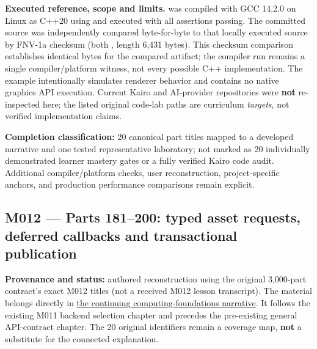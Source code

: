 \textbf{Executed reference, scope and limits.}  was compiled with GCC 14.2.0 on Linux as C++20 using  and executed with all assertions passing. The committed source was independently compared byte-for-byte to that locally executed source by FNV-1a checksum (both , length 6,431 bytes). This checksum comparison establishes identical bytes for the compared artifact; the compiler run remains a single compiler/platform witness, not every possible C++ implementation. The example intentionally simulates renderer behavior and contains no native graphics API execution. Current Kairo and AI-provider repositories were \textbf{not} re-inspected here; the listed original code-lab paths are curriculum \emph{targets}, not verified implementation claims.

\textbf{Completion classification:} 20 canonical part titles mapped to a developed narrative and one tested representative laboratory; not marked as 20 individually demonstrated learner mastery gates or a fully verified Kairo code audit. Additional compiler/platform checks, user reconstruction, project-specific anchors, and production performance comparisons remain explicit.

\subsection{M012 --- Parts 181--200: typed asset requests, deferred callbacks and transactional publication}\label{appendix-fd090d982a15-m012-parts-181200-typed-asset-requests-deferred-callbacks-and-transactional-publication}

\hypertarget{appendix-fd090d982a15-m012-parts-181200-typed-asset-requests-deferred-callbacks-and-transactional-publication}{}

\textbf{Provenance and status:} authored reconstruction using the original 3,000-part contract's exact M012 titles (not a received M012 lesson transcript). The material belongs directly in \hyperref[01-foundations-i-ch004-from-an-accepted-render-request-to-a-resource-that-survives-failures-and-callbacks]{the continuing computing-foundations narrative}. It follows the existing M011 backend selection chapter and precedes the pre-existing general API-contract chapter. The 20 original identifiers remain a coverage map, \textbf{not} a substitute for the connected explanation.

